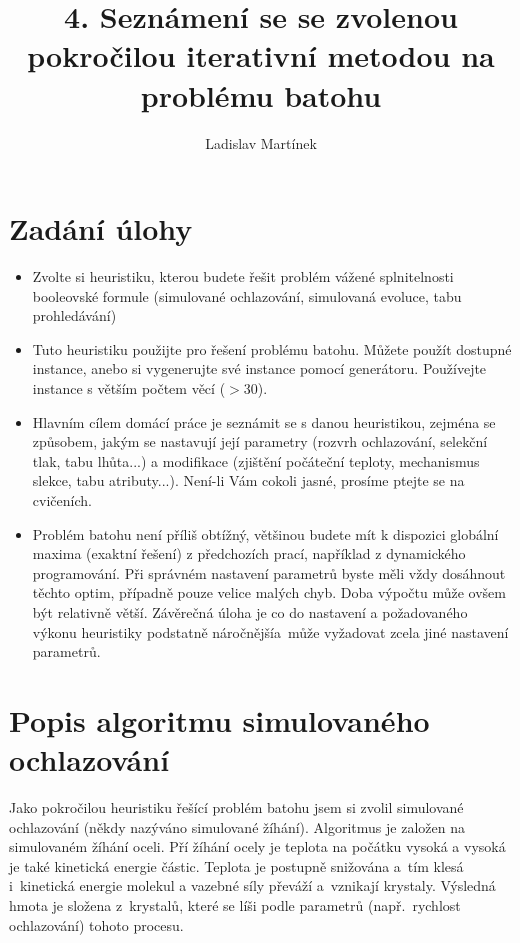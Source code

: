 \documentclass[11pt]{article}
\begin{document}

\title{4. Seznámení se se zvolenou pokročilou iterativní metodou na problému batohu}
\author{Ladislav Martínek}
\date{}
\maketitle
 
\section{Zadání úlohy} 

\begin{itemize}
\item Zvolte si heuristiku, kterou budete řešit problém vážené splnitelnosti booleovské formule (simulované ochlazování, simulovaná evoluce, tabu prohledávání)
\item Tuto heuristiku použijte pro řešení problému batohu. Můžete použít dostupné instance, anebo si vygenerujte své instance pomocí generátoru. Používejte instance s větším počtem věcí ($>$30).
\item Hlavním cílem domácí práce je seznámit se s danou heuristikou, zejména se způsobem, jakým se nastavují její parametry (rozvrh ochlazování, selekční tlak, tabu lhůta...) a modifikace (zjištění počáteční teploty, mechanismus slekce, tabu atributy...). Není-li Vám cokoli jasné, prosíme ptejte se na cvičeních.
\item Problém batohu není příliš obtížný, většinou budete mít k dispozici globální maxima (exaktní řešení) z předchozích prací, například z dynamického programování. Při správném nastavení parametrů byste měli vždy dosáhnout těchto optim, případně pouze velice malých chyb. Doba výpočtu může ovšem být relativně větší. Závěrečná úloha je co do nastavení a požadovaného výkonu heuristiky podstatně náročnějšía~může vyžadovat zcela jiné nastavení parametrů.

\end{itemize}


\section{Popis algoritmu simulovaného ochlazování}\label{kap:1}
Jako pokročilou heuristiku řešící problém batohu jsem si zvolil simulované ochlazování (někdy nazýváno simulované žíhání). Algoritmus je založen na simulovaném žíhání oceli. Pří žíhání ocely je teplota na počátku vysoká a vysoká je také kinetická energie částic. Teplota je postupně snižována a~tím klesá i~kinetická energie molekul a vazebné síly převáží a~vznikají krystaly. Výsledná hmota je složena z~krystalů, které se líši podle parametrů (např.~rychlost ochlazování) tohoto procesu. 
\end{document}

